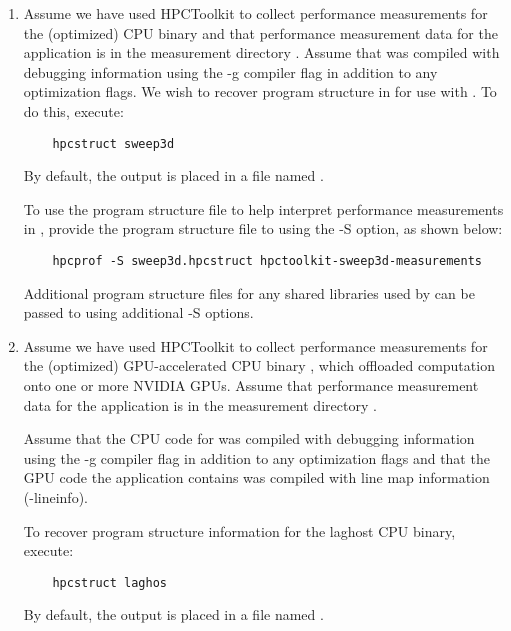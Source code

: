 \documentclass[english]{article}
\begin{document}
\begin{enumerate}
\item 
Assume we have used HPCToolkit to collect performance measurements for the (optimized) CPU binary 
 and that performance measurement data for the application is in the measurement 
directory . 
Assume that  was compiled with debugging information using the -g compiler flag in addition to any
optimization flags. 
We wish to recover program structure in 
for use with .
To do this, execute:

\begin{verbatim}
    hpcstruct sweep3d
\end{verbatim}

By default, the output is placed in a file named . 

To use the program structure file to help interpret performance measurements in , 
provide the program structure file to  using the -S option, as shown below:

\begin{verbatim}
    hpcprof -S sweep3d.hpcstruct hpctoolkit-sweep3d-measurements
\end{verbatim}

Additional program structure files for any shared libraries used by  
can be passed to  using additional -S options. 

\item
Assume we have used HPCToolkit to collect performance measurements for the (optimized) GPU-accelerated 
CPU binary , which offloaded computation onto one or more NVIDIA GPUs.
Assume that performance measurement data for the application is in the measurement 
directory . 


Assume that the CPU code for  was compiled with debugging information using the -g compiler flag in addition to any
optimization flags and that the GPU code the application contains was compiled with line map information (-lineinfo).

To recover program structure information for the laghost CPU binary, execute:

\begin{verbatim}
    hpcstruct laghos
\end{verbatim}

By default, the output is placed in a file named .


\end{enumerate}
\end{document}
